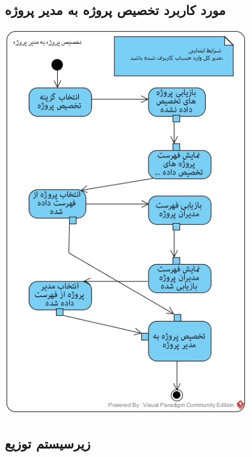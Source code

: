 \documentclass{article}
\begin{document}
\subsection*{مورد کاربرد تخصیص پروژه به مدیر پروژه}
\vspace{1cm}
\begin{center}
\includegraphics[width=0.8\textwidth]{ActivityDiagrams/34.jpg}
\end{center}


\subsection{زیرسیستم توزیع}
\vspace{1cm}
\end{document}
